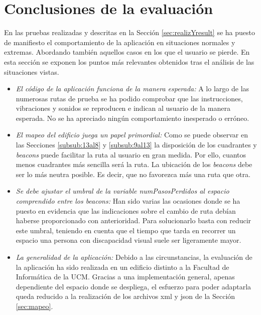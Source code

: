 \section{Conclusiones de la evaluación}
\label{sec:conclusionesEval}

En las pruebas realizadas y descritas en la Sección \ref{sec:realizYresult} se ha puesto de manifiesto el comportamiento de la aplicación en situaciones normales y extremas. Abordando también aquellos casos en los que el usuario se pierde. En esta sección se exponen los puntos más relevantes obtenidos tras el análisis de las situaciones vistas.


\begin{itemize}
	\item \textit{El código de la aplicación funciona de la manera esperada:} A lo largo de las numerosas rutas de prueba se ha podido comprobar que las instrucciones, vibraciones y sonidos se reproducen e indican al usuario de la manera esperada. No se ha apreciado ningún comportamiento inesperado o erróneo. 
	
	\item \textit{El mapeo del edificio juega un papel primordial:} Como se puede observar en las Secciones \ref{subsub:13al8} y \ref{subsub:9al13} la disposición de los cuadrantes y \textit{beacons} puede facilitar la ruta al usuario en gran medida. Por ello, cuantos menos cuadrantes más sencilla será la ruta. La ubicación de los \textit{beacons} debe ser lo más neutra posible. Es decir, que no favorezca más una ruta que otra.
	
	\item  \textit{Se debe ajustar el umbral de la variable numPasosPerdidos al espacio comprendido entre los beacons:} Han sido varias las ocasiones donde se ha puesto en evidencia que las indicaciones sobre el cambio de ruta debían haberse proporcionado con anterioridad. Para solucionarlo basta con reducir este umbral, teniendo en cuenta que el tiempo que tarda en recorrer un espacio una persona con discapacidad visual suele ser ligeramente mayor.
	
	\item \textit{La generalidad de la aplicación:} Debido a las circunstancias, la evaluación de la aplicación ha sido realizada en un edificio distinto a la Facultad de Informática de la UCM. Gracias a una implementación general, apenas dependiente del espacio donde se despliega, el esfuerzo para poder adaptarla queda reducido a la realización de los archivos xml y json de la Sección \ref{sec:mapeo}.
	

\end{itemize}
